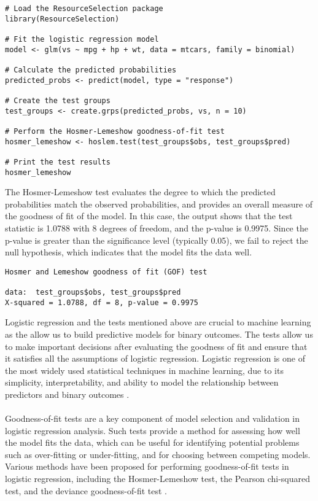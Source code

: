 \documentclass{article}[12pt]
\theoremstyle{definition}
\begin{document}
\bigskip

\begin{verbatim}
# Load the ResourceSelection package
library(ResourceSelection)

# Fit the logistic regression model
model <- glm(vs ~ mpg + hp + wt, data = mtcars, family = binomial)

# Calculate the predicted probabilities
predicted_probs <- predict(model, type = "response")

# Create the test groups
test_groups <- create.grps(predicted_probs, vs, n = 10)

# Perform the Hosmer-Lemeshow goodness-of-fit test
hosmer_lemeshow <- hoslem.test(test_groups$obs, test_groups$pred)

# Print the test results
hosmer_lemeshow

\end{verbatim}

\newpage

\bigskip

\noindent
The Hosmer-Lemeshow test evaluates the degree to which the predicted probabilities match the observed probabilities, and provides an overall measure of the goodness of fit of the model. In this case, the output shows that the test statistic is 1.0788 with 8 degrees of freedom, and the p-value is 0.9975. Since the p-value is greater than the significance level (typically 0.05), we fail to reject the null hypothesis, which indicates that the model fits the data well.

\bigskip

\begin{verbatim}
Hosmer and Lemeshow goodness of fit (GOF) test

data:  test_groups$obs, test_groups$pred
X-squared = 1.0788, df = 8, p-value = 0.9975
\end{verbatim}

\bigskip

\noindent
Logistic regression and the tests mentioned above are crucial to machine learning as the allow us to build predictive models for binary outcomes. The tests allow us to make important decisions after evaluating the goodness of fit and ensure that it satisfies all the assumptions of logistic regression. Logistic regression is one of the most widely used statistical techniques in machine learning, due to its simplicity, interpretability, and ability to model the relationship between predictors and binary outcomes \cite{lee2020logistic}. 
\\
\\
Goodness-of-fit tests are a key component of model selection and validation in logistic regression analysis. Such tests provide a method for assessing how well the model fits the data, which can be useful for identifying potential problems such as over-fitting or under-fitting, and for choosing between competing models. Various methods have been proposed for performing goodness-of-fit tests in logistic regression, including the Hosmer-Lemeshow test, the Pearson chi-squared test, and the deviance goodness-of-fit test \cite{austin2015goodness}.
\end{document}
